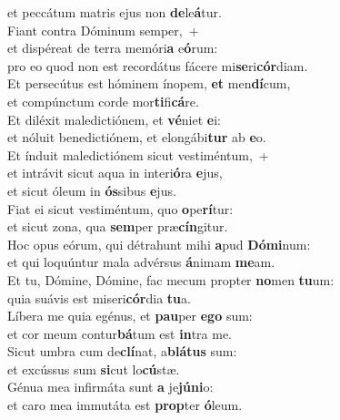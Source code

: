 \oddverse et peccátum matris ejus non \textbf{de}le\textbf{á}tur.\\
\evenverse Fiant contra Dóminum semper,~+\\
\evenverse  et dispéreat de terra memóri\textbf{a} e\textbf{ó}rum:~\*\\
\evenverse pro eo quod non est recordátus fácere mi\textbf{se}ri\textbf{cór}diam.\\
\oddverse Et persecútus est hóminem ínopem, \textbf{et} men\textbf{dí}cum,~\*\\
\oddverse et compúnctum corde mor\textbf{ti}fi\textbf{cá}re.\\
\evenverse Et diléxit maledictiónem, et \textbf{vé}niet \textbf{e}i:~\*\\
\evenverse et nóluit benedictiónem, et elongábi\textbf{tur} ab \textbf{e}o.\\
\oddverse Et índuit maledictiónem sicut vestiméntum,~+\\
\oddverse  et intrávit sicut aqua in interi\textbf{ó}ra \textbf{e}jus,~\*\\
\oddverse et sicut óleum in \textbf{ós}sibus \textbf{e}jus.\\
\evenverse Fiat ei sicut vestiméntum, quo \textbf{o}pe\textbf{rí}tur:~\*\\
\evenverse et sicut zona, qua \textbf{sem}per præ\textbf{cín}gitur.\\
\oddverse Hoc opus eórum, qui détrahunt mihi \textbf{a}pud \textbf{Dó}\textbf{mi}num:~\*\\
\oddverse et qui loquúntur mala advérsus \textbf{á}nimam \textbf{me}am.\\
\evenverse Et tu, Dómine, Dómine, fac mecum propter \textbf{no}men \textbf{tu}um:~\*\\
\evenverse quia suávis est miseri\textbf{cór}dia \textbf{tu}a.\\
\oddverse Líbera me quia egénus, et \textbf{pau}per \textbf{e}\textbf{go} sum:~\*\\
\oddverse et cor meum contur\textbf{bá}tum est \textbf{in}tra me.\\
\evenverse Sicut umbra cum de\textbf{clí}nat, a\textbf{blá}\textbf{tus} sum:~\*\\
\evenverse et excússus sum \textbf{si}cut lo\textbf{cú}stæ.\\
\oddverse Génua mea infirmáta sunt \textbf{a} je\textbf{jú}\textbf{ni}o:~\*\\
\oddverse et caro mea immutáta est \textbf{prop}ter \textbf{ó}leum.\\
